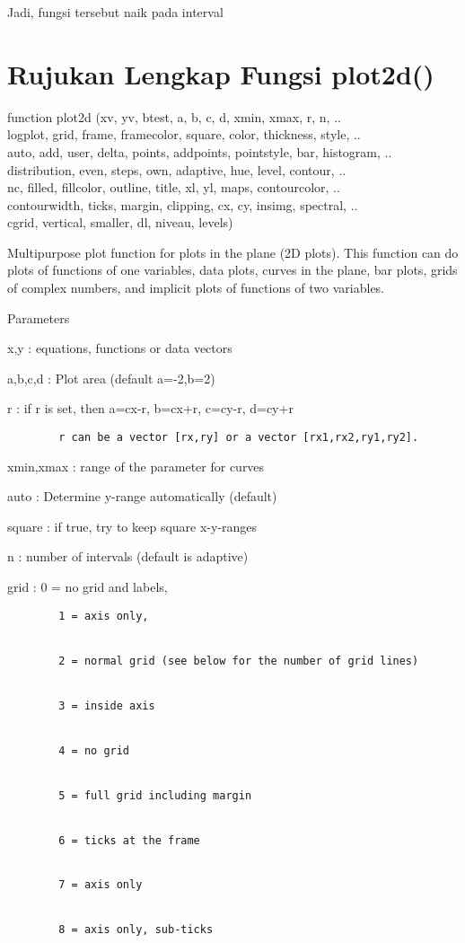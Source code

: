 \documentclass[
]{book}
\begin{document}
Jadi, fungsi tersebut naik pada interval

\section{Rujukan Lengkap Fungsi plot2d()}\label{rujukan-lengkap-fungsi-plot2d}

function plot2d (xv, yv, btest, a, b, c, d, xmin, xmax, r, n, ..\\
logplot, grid, frame, framecolor, square, color, thickness, style, ..\\
auto, add, user, delta, points, addpoints, pointstyle, bar, histogram, ..\\
distribution, even, steps, own, adaptive, hue, level, contour, ..\\
nc, filled, fillcolor, outline, title, xl, yl, maps, contourcolor, ..\\
contourwidth, ticks, margin, clipping, cx, cy, insimg, spectral, ..\\
cgrid, vertical, smaller, dl, niveau, levels)

Multipurpose plot function for plots in the plane (2D plots). This function can do plots of functions of one variables, data plots, curves in the plane, bar plots, grids of complex numbers, and implicit plots of functions of two variables.

Parameters

x,y : equations, functions or data vectors

a,b,c,d : Plot area (default a=-2,b=2)

r : if r is set, then a=cx-r, b=cx+r, c=cy-r, d=cy+r

\begin{verbatim}
        r can be a vector [rx,ry] or a vector [rx1,rx2,ry1,ry2].
\end{verbatim}

xmin,xmax : range of the parameter for curves

auto : Determine y-range automatically (default)

square : if true, try to keep square x-y-ranges

n : number of intervals (default is adaptive)

grid : 0 = no grid and labels,

\begin{verbatim}
        1 = axis only,


        2 = normal grid (see below for the number of grid lines)


        3 = inside axis


        4 = no grid


        5 = full grid including margin


        6 = ticks at the frame


        7 = axis only


        8 = axis only, sub-ticks
\end{verbatim}
\end{document}
